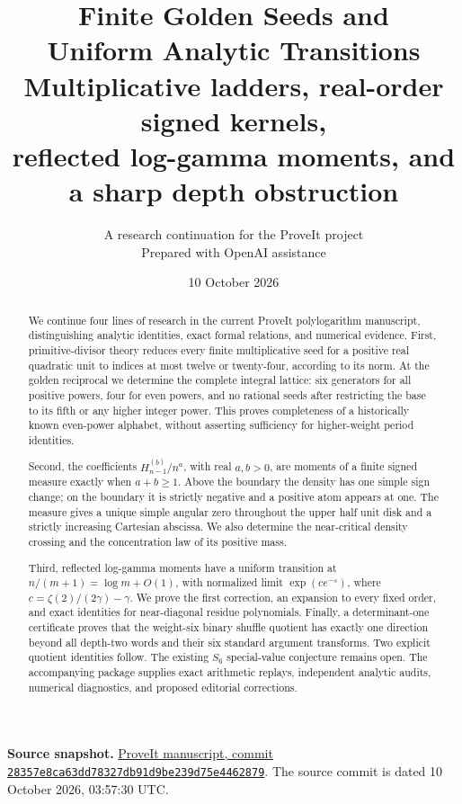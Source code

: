 \documentclass[11pt,letterpaper]{article}
\title{\textbf{Finite Golden Seeds and\\Uniform Analytic Transitions}\\[8pt]
 \large Multiplicative ladders, real-order signed kernels,\\
 reflected log-gamma moments, and a sharp depth obstruction}
\author{A research continuation for the ProveIt project\\
 \small Prepared with OpenAI assistance}
\date{10 October 2026}
\theoremstyle{definition}
\theoremstyle{remark}
\numberwithin{equation}{section}
\begin{document}
\maketitle
\begin{abstract}
We continue four lines of research in the current ProveIt polylogarithm
manuscript, distinguishing analytic identities, exact formal relations,
and numerical evidence. First, primitive-divisor theory reduces every
finite multiplicative seed for a positive real quadratic unit to indices
at most twelve or twenty-four, according to its norm. At the golden
reciprocal we determine the complete integral lattice: six generators
for all positive powers, four for even powers, and no rational seeds
after restricting the base to its fifth or any higher integer power.
This proves completeness of a historically known even-power alphabet,
without asserting sufficiency for higher-weight period identities.

Second, the coefficients \(H_{n-1}^{(b)}/n^a\), with real \(a,b>0\),
are moments of a finite signed measure exactly when \(a+b\ge1\).
Above the boundary the density has one simple sign change; on the
boundary it is strictly negative and a positive atom appears at one.
The measure gives a unique simple angular zero throughout the upper
half unit disk and a strictly increasing Cartesian abscissa.
We also determine the near-critical density crossing and the
concentration law of its positive mass.

Third, reflected log-gamma moments have a uniform transition at
\(n/(m+1)=\log m+O(1)\), with normalized limit
\(\exp(c e^{-s})\), where \(c=\zeta(2)/(2\gamma)-\gamma\).
We prove the first correction, an expansion to every fixed order,
and exact identities for near-diagonal residue polynomials.
Finally, a determinant-one certificate proves that the weight-six
binary shuffle quotient has exactly one direction beyond all
depth-two words and their six standard argument transforms.
Two explicit quotient identities follow.
The existing \(S_6\) special-value conjecture remains open.
The accompanying package supplies exact arithmetic replays,
independent analytic audits, numerical diagnostics, and proposed
editorial corrections.
\end{abstract}
\medskip
\noindent\textbf{Source snapshot.}
\href{https://github.com/VladimirReshetnikov/ProveIt/tree/28357e8ca63dd78327db91d9be239d75e4462879/Analysis/Polylogarithms/docs/manuscript}
{ProveIt manuscript, commit \texttt{28357e8ca63dd78327db91d9be239d75e4462879}}.
The source commit is dated 10 October 2026, 03:57:30 UTC.
\clearpage
\begingroup
\small
\tableofcontents
\endgroup
\clearpage
\end{document}
